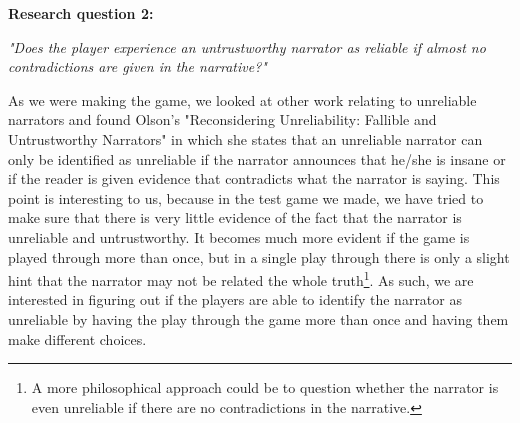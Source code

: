\textbf{Research question 2:}
\begin{center}
\textit{"Does the player experience an untrustworthy narrator as reliable if almost no contradictions are given in the narrative?"}
\end{center}
As we were making the game, we looked at other work relating to unreliable narrators and found Olson's "Reconsidering Unreliability: Fallible and Untrustworthy Narrators" in which she states that an unreliable narrator can only be identified as unreliable if the narrator announces that he/she is insane or if the reader is given evidence that contradicts what the narrator is saying\cite[p. 104]{Olson}. This point is interesting to us, because in the test game we made, we have tried to make sure that there is very little evidence of the fact that the narrator is unreliable and untrustworthy. It becomes much more evident if the game is played through more than once, but in a single play through there is only a slight hint that the narrator may not be related the whole truth\footnote{A more philosophical approach could be to question whether the narrator is even unreliable if there are no contradictions in the narrative.}. As such, we are interested in figuring out if the players are able to identify the narrator as unreliable by having the play through the game more than once and having them make different choices.